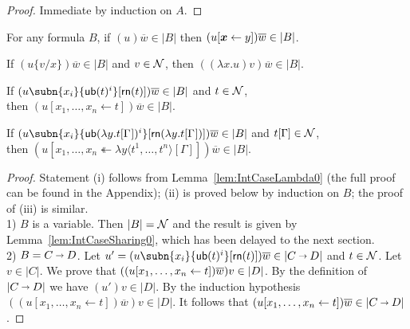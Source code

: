 \documentclass[orivec]{llncs}
\begin{document}
\begin{proof}
 Immediate by induction on $A$.
\end{proof}

\begin{ALlemma}\label{lem:Red-AddSharings}
For any formula $B$,  if $(u)\overline{w}\in |B|$ then $(u\share*{\vv*x}y)\overline{w} \in |B|$.
\end{ALlemma}

\begin{ALlemma}\label{lem:IntCaseLambdaSharing}
\begin{compactenum}[\upshape(i)]
%
\item If $(u\{v/x\})\overline{w} \in |B|$ and $v\in\mathcal{N}$, then $((\lambda x.u) v)\overline{w} \in |B|$.
%
\item If $(u\subn{x_i}{\sn(t)^i}[\sh (t)])\overline{w} \in |B|$ and $t\in\mathcal{N}$, 
	\\ then $(u[x_1,\dots,x_n \leftarrow t])\overline{w} \in |B|$.
%
\item If $(u\subn{x_i}{\sn(\lambda y.t\G)^i}[\sh (\lambda y.t\G)])\overline{w} \in |B|$ and $t[\Gamma]\in\mathcal{N}$,
	\\ then $(u[x_1,\dots,x_n \twoheadleftarrow \lambda y\langle t^1,\dots,t^n \rangle[\Gamma]])\overline{w} \in |B|$.
%
\end{compactenum}
%
\end{ALlemma}

\begin{proof}
Statement (i) follows from Lemma~\ref{lem:IntCaseLambda0} (the full proof can be found in the Appendix); (ii) is proved below by induction on $B$; the proof of (iii) is similar.
%
\\
1) $B$ is a variable. Then $|B| = \mathcal{N}$ and the result is given by Lemma~\ref{lem:IntCaseSharing0}, which has been delayed to the next section.
\\
2) $B= C\vlim D$.
%
Let $u'=(u\subn{x_i}{\sn(t)^i}[\sh (t)])\overline{w} \in |C\vlim D|$ and $t\in\mathcal{N}$.
%
Let $v\in|C|$.
%
We prove that $((u\share xt)\overline{w})v \in |D|$.
%
By the definition of $|C\vlim D|$ we have $(u')v\in|D|$.
%
By the induction hypothesis $((u[x_1,\dots,x_n \leftarrow t])\overline{w})v \in |D|$.
%
It follows that $(u[x_1,\dots,x_n \leftarrow t])\overline{w} \in |C\vlim D|$.

\end{proof}
\end{document}
